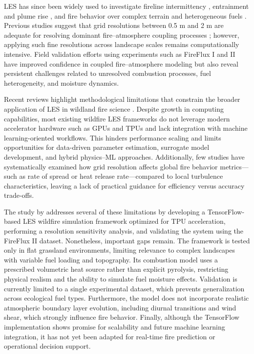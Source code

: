 \documentclass[conference]{IEEEtran}
\begin{document}
LES has since been widely used to investigate fireline intermittency \citep{pimont2021fireline}, entrainment and plume rise \citep{kochanski2013evaluation}, and fire behavior over complex terrain and heterogeneous fuels \citep{mueller2014modeling}. Previous studies suggest that grid resolutions between 0.5 m and 2 m are adequate for resolving dominant fire--atmosphere coupling processes \citep{hiers2020interactions}; however, applying such fine resolutions across landscape scales remains computationally intensive. Field validation efforts using experiments such as FireFlux I and II \citep{clements2007observing,canfield2014fireflux} have improved confidence in coupled fire--atmosphere modeling but also reveal persistent challenges related to unresolved combustion processes, fuel heterogeneity, and moisture dynamics.

Recent reviews highlight methodological limitations that constrain the broader application of LES in wildland fire science \citep{bakhshaii2019review,linn2021conceptual}. Despite growth in computing capabilities, most existing wildfire LES frameworks do not leverage modern accelerator hardware such as GPUs and TPUs and lack integration with machine learning-oriented workflows. This hinders performance scaling and limits opportunities for data-driven parameter estimation, surrogate model development, and hybrid physics--ML approaches. Additionally, few studies have systematically examined how grid resolution affects global fire behavior metrics---such as rate of spread or heat release rate---compared to local turbulence characteristics, leaving a lack of practical guidance for efficiency versus accuracy trade-offs.

The study by \citep{wang2023high} addresses several of these limitations by developing a TensorFlow-based LES wildfire simulation framework optimized for TPU acceleration, performing a resolution sensitivity analysis, and validating the system using the FireFlux II dataset. Nonetheless, important gaps remain. The framework is tested only in flat grassland environments, limiting relevance to complex landscapes with variable fuel loading and topography. Its combustion model uses a prescribed volumetric heat source rather than explicit pyrolysis, restricting physical realism and the ability to simulate fuel moisture effects. Validation is currently limited to a single experimental dataset, which prevents generalization across ecological fuel types. Furthermore, the model does not incorporate realistic atmospheric boundary layer evolution, including diurnal transitions and wind shear, which strongly influence fire behavior. Finally, although the TensorFlow implementation shows promise for scalability and future machine learning integration, it has not yet been adapted for real-time fire prediction or operational decision support.
\end{document}
